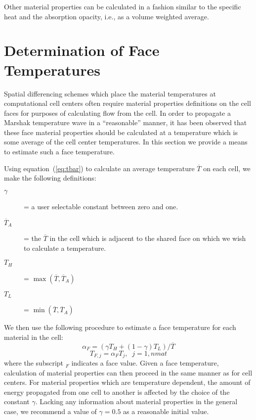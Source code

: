 \documentclass[12pt]{article}
\begin{document}
Other material properties can be calculated in a fashion similar
to the specific heat and the absorption opacity, i.e.,
as a volume weighted average.


\section{Determination of Face Temperatures}

Spatial differencing schemes which place the material temperatures at
computational cell centers often require material properties definitions
on the cell faces for purposes of calculating flow from the cell. 
In order to propagate a Marshak temperature wave  
in a ``reasonable'' manner, it has been observed
that these face material properties should be calculated at a temperature
which is  some average of the cell center temperatures. In this section
we provide a means to estimate such a face temperature.

Using equation~(\ref{eq:tbar}) to calculate an average temperature
 $\overline{T}$ on each cell, we make the following definitions:
\begin{description}
\item[$\gamma$] = a user selectable constant between zero and one.
\item[$\overline{T}_{A}$] = the $\overline{T}$ in the cell which is adjacent
      to the shared face on which we wish to calculate a temperature.
\item[$T_{H}$] = $\max( \overline{T}, \overline{T}_{A})$
\item[$T_{L}$] = $\min( \overline{T}, \overline{T}_{A})$
\end{description}
We then use the following procedure to estimate a face temperature for
each material in the cell:
\begin{equation}
\alpha_{F} = (\gamma T_{H} + (1 - \gamma) T_{L})/\overline{T}
\end{equation}
\begin{equation}
T_{F,j} = \alpha_{F}T_{j}, \; \; j=1,nmat
\end{equation}
where the subscript $_{F}$ indicates a face value. Given a face
temperature, calculation of material properties can then proceed
in the same manner as for cell centers.
For material properties which are temperature dependent, the amount of
energy propagated from one cell to another is affected by the choice of the
constant $\gamma$. Lacking any information about material properties
in the general case, we recommend a value of $\gamma = 0.5$ as a
reasonable initial value.
\end{document}
